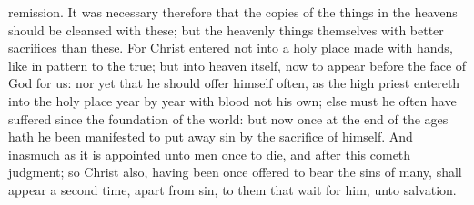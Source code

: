 remission.  It was necessary therefore that the copies of the things in the heavens should be cleansed with these; but the heavenly things themselves with better sacrifices than these. For Christ entered not into a holy place made with hands, like in pattern to the true; but into heaven itself, now to appear before the face of God for us: nor yet that he should offer himself often, as the high priest entereth into the holy place year by year with blood not his own; else must he often have suffered since the foundation of the world: but now once at the end of the ages hath he been manifested to put away sin by the sacrifice of himself. And inasmuch as it is appointed unto men once to die, and after this cometh judgment; so Christ also, having been once offered to bear the sins of many, shall appear a second time, apart from sin, to them that wait for him, unto salvation. 

